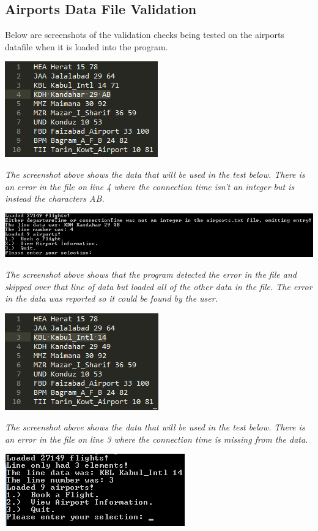 \documentclass[10pt, a4paper]{article}
\begin{document}
\newpage

\subsection{Airports Data File Validation}
Below are screenshots of the validation checks being tested on the airports datafile when it is loaded into the program.

\includegraphics{Data1.png}

\textit{The screenshot above shows the data that will be used in the test below. There is an error in the file on line 4 where the connection time isn't an integer but is instead the characters AB.}

\includegraphics[scale=0.85]{DataValidation1.png}

\textit{The screenshot above shows that the program detected the error in the file and skipped over that line of data but loaded all of the other data in the file. The error in the data was reported so it could be found by the user.}

\includegraphics{Data2.png}

\textit{The screenshot above shows the data that will be used in the test below. There is an error in the file on line 3 where the connection time is missing from the data.}

\includegraphics{DataValidation2.png}
\end{document}
